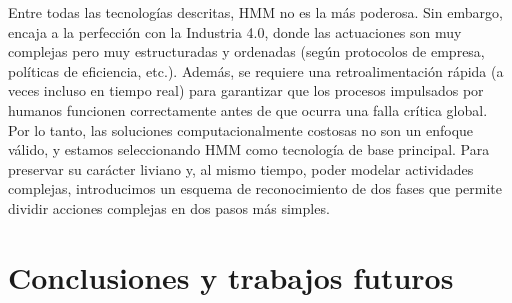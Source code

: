 \documentclass[10pt]{article}
\begin{document}
Entre todas las tecnologías descritas, HMM no es la más poderosa. Sin embargo, encaja a la perfección con la Industria 4.0, donde las actuaciones son muy complejas pero muy estructuradas y ordenadas (según protocolos de empresa, políticas de eficiencia, etc.). Además, se requiere una retroalimentación rápida (a veces incluso en tiempo real) para garantizar que los procesos impulsados ​​por humanos funcionen correctamente antes de que ocurra una falla crítica global. Por lo tanto, las soluciones computacionalmente costosas no son un enfoque válido, y estamos seleccionando HMM como tecnología de base principal. Para preservar su carácter liviano y, al mismo tiempo, poder modelar actividades complejas, introducimos un esquema de reconocimiento de dos fases que permite dividir acciones complejas en dos pasos más simples.



\section{Conclusiones y trabajos futuros}
\end{document}
